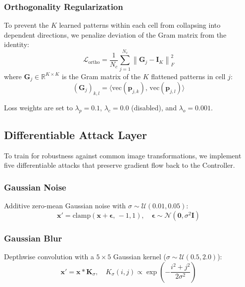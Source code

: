 \documentclass[conference]{IEEEtran}
\newcommand{\R}{\mathbb{R}}
\newcommand{\Lcal}{\mathcal{L}}
\newcommand{\Ncal}{\mathcal{N}}
\newcommand{\Ucal}{\mathcal{U}}
\begin{document}
\subsubsection{Orthogonality Regularization}
To prevent the $K$ learned patterns within each cell from collapsing into dependent directions, we penalize deviation of the Gram matrix from the identity:
\begin{equation}
    \Lcal_\text{ortho} = \frac{1}{N_c} \sum_{j=1}^{N_c} \left\| \mathbf{G}_j - \mathbf{I}_K \right\|_F^2
    \label{eq:loss_ortho}
\end{equation}
where $\mathbf{G}_j \in \R^{K \times K}$ is the Gram matrix of the $K$ flattened patterns in cell $j$:
\begin{equation}
    (\mathbf{G}_j)_{k,l} = \langle \text{vec}(\mathbf{p}_{j,k}),\, \text{vec}(\mathbf{p}_{j,l}) \rangle
\end{equation}

Loss weights are set to $\lambda_p = 0.1$, $\lambda_c = 0.0$ (disabled), and $\lambda_o = 0.001$.

\subsection{Differentiable Attack Layer}
\label{sec:attacks}

To train for robustness against common image transformations, we implement five differentiable attacks that preserve gradient flow back to the Controller.

\subsubsection{Gaussian Noise}
Additive zero-mean Gaussian noise with $\sigma \sim \Ucal(0.01, 0.05)$:
\begin{equation}
    \mathbf{x}' = \text{clamp}(\mathbf{x} + \bm{\epsilon},\, -1, 1), \quad \bm{\epsilon} \sim \Ncal(\mathbf{0}, \sigma^2 \mathbf{I})
\end{equation}

\subsubsection{Gaussian Blur}
Depthwise convolution with a $5\times5$ Gaussian kernel ($\sigma \sim \Ucal(0.5, 2.0)$):
\begin{equation}
    \mathbf{x}' = \mathbf{x} \ast \mathbf{K}_\sigma, \quad K_\sigma(i,j) \propto \exp\!\left(-\frac{i^2 + j^2}{2\sigma^2}\right)
\end{equation}
\end{document}

